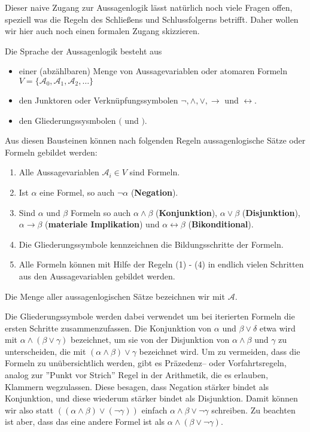 \bigbreak 

Dieser naive Zugang zur Aussagenlogik lässt natürlich noch viele Fragen offen, speziell was die Regeln des 
Schließens und Schlussfolgerns betrifft. Daher wollen wir hier auch noch einen formalen Zugang skizzieren.

\begin{definition} Die Sprache der Aussagenlogik besteht aus 

\begin{itemize} 
\item einer (abzählbaren) Menge von Aussagevariablen oder atomaren Formeln 
$V = \{\mathscr{A}_0, \mathscr{A}_1, \mathscr{A}_2, \ldots \}$
\item den Junktoren oder Verknüpfungssymbolen $\neg, \wedge, \vee, \rightarrow$ und $\leftrightarrow$.
\item den Gliederungssysmbolen $($ und $)$.
\end{itemize}

Aus diesen Bausteinen können nach folgenden Regeln aussagenlogische Sätze oder Formeln gebildet werden:
\begin{enumerate}
\item Alle Aussagevariablen $\mathscr{A}_i \in V$ sind Formeln.
\item Ist $\alpha$ eine Formel, so auch $\neg \alpha$ (\textbf{Negation}).
\item Sind $\alpha$ und $\beta$ Formeln so auch $\alpha \wedge \beta$ (\textbf{Konjunktion}), 
$\alpha \vee \beta$ (\textbf{Disjunktion}), $\alpha \rightarrow \beta$ (\textbf{materiale Implikation}) und 
$\alpha \leftrightarrow \beta$ (\textbf{Bikonditional}).
\item Die Gliederungssymbole kennzeichnen die Bildungsschritte der Formeln.
\item Alle Formeln können mit Hilfe der Regeln (1) - (4) in endlich vielen Schritten aus den Aussagevariablen 
gebildet werden.
\end{enumerate}
Die Menge aller aussagenlogischen Sätze bezeichnen wir mit $\mathcal{A}$.
\end{definition}

Die Gliederungssymbole werden dabei verwendet um bei iterierten Formeln die ersten Schritte zusammenzufassen. Die 
Konjunktion von $\alpha$ und $\beta \vee \delta$ etwa wird mit $\alpha \wedge ( \beta \vee \gamma )$ bezeichnet, 
um sie von der Disjunktion von $\alpha \wedge \beta$ und $\gamma$ zu unterscheiden, die mit 
$(\alpha \wedge \beta) \vee \gamma$ bezeichnet wird. Um zu vermeiden, dass die Formeln zu unübersichtlich werden, 
gibt es Präzedenz-- oder Vorfahrtsregeln, analog zur ''Punkt vor Strich'' Regel in der Arithmetik, die es 
erlauben, Klammern wegzulassen. Diese besagen, dass Negation stärker bindet als Konjunktion, und diese wiederum 
stärker bindet als Disjunktion. Damit können wir also statt $\left(\left( \alpha \wedge \beta \right) \vee 
\left(\neg \gamma \right) \right)$ einfach $\alpha \wedge \beta \vee \neg \gamma$ schreiben. Zu beachten ist aber, 
dass das eine andere Formel ist als $\alpha \wedge \left(\beta \vee \neg \gamma \right)$.

